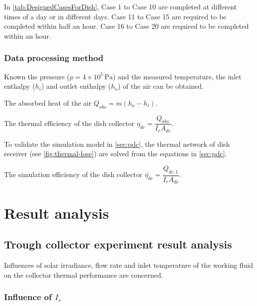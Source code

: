 In \autoref{tab:DesignedCasesForDish}, Case 1 to Case 10 are completed at different times of a day or in different days. Case 11 to Case 15 are required to be completed within half an hour. Case 16 to Case 20 are required to be completed within an hour.

\subsubsection{Data processing method}
Known the pressure ($p = 4\times10^5\,\mathrm{Pa}$) and the measured temperature, the inlet enthalpy ($h_i$) and outlet enthalpy ($h_o$) of the air can be obtained.

The absorbed heat of the air $Q_{abs} = \dot{m}(h_o - h_i)$.

The thermal efficiency of the dish collector $\eta_{dc} = \dfrac{Q_{abs}}{I_r A_{dc}}$. 

To validate the simulation model in \autoref{sec:pdc}, %
the thermal network of dish receiver (see \autoref{fig:thermal-lose}) are solved from the equations in \autoref{sec:pdc}.

The simulation efficiency of the dish collector $\widetilde{\eta_{dc}} = \dfrac{Q_{dr,1}}{I_r A_{dc}}$.

\section{Result analysis}
\subsection{Trough collector experiment result analysis}
Influences of solar irradiance, flow rate and inlet temperature of the working fluid on the collector thermal performance are concerned.
\subsubsection{Influence of $I_r$}

